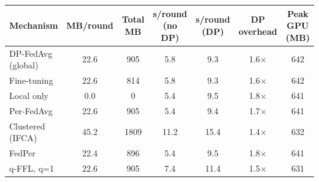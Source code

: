 \begin{tabular}{lcccccc}
\toprule
Mechanism & MB/round & Total MB & s/round (no DP) & s/round (DP) & DP overhead & Peak GPU (MB) \\
\midrule
DP-FedAvg (global) & 22.6 & 905 & 5.8 & 9.3 & 1.6$\times$ & 642 \\
Fine-tuning & 22.6 & 814 & 5.8 & 9.3 & 1.6$\times$ & 642 \\
Local only & 0.0 & 0 & 5.4 & 9.5 & 1.8$\times$ & 641 \\
Per-FedAvg & 22.6 & 905 & 5.4 & 9.4 & 1.7$\times$ & 641 \\
Clustered (IFCA) & 45.2 & 1809 & 11.2 & 15.4 & 1.4$\times$ & 632 \\
FedPer & 22.4 & 896 & 5.4 & 9.5 & 1.8$\times$ & 641 \\
q-FFL, q=1 & 22.6 & 905 & 7.4 & 11.4 & 1.5$\times$ & 631 \\
\bottomrule
\end{tabular}
